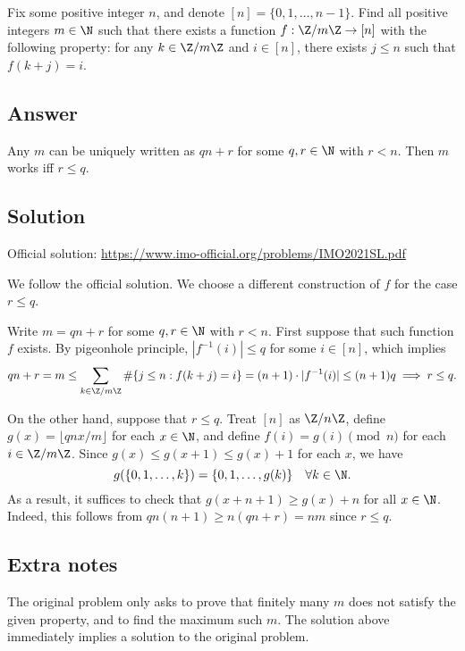 Fix some positive integer $n$, and denote $[n] = \{0, 1, \ldots, n - 1\}$.
Find all positive integers $m \in \N$ such that there exists a function $f : \Z/m\Z \to [n]$ with the following property:
    for any $k \in \Z/m\Z$ and $i \in [n]$, there exists $j \leq n$ such that $f(k + j) = i$.



\subsection*{Answer}

Any $m$ can be uniquely written as $qn + r$ for some $q, r \in \N$ with $r < n$.
Then $m$ works iff $r \leq q$.



\subsection*{Solution}

Official solution: \url{https://www.imo-official.org/problems/IMO2021SL.pdf}

We follow the official solution.
We choose a different construction of $f$ for the case $r \leq q$.

Write $m = qn + r$ for some $q, r \in \N$ with $r < n$.
First suppose that such function $f$ exists.
By pigeonhole principle, $|f^{-1}(i)| \leq q$ for some $i \in [n]$, which implies
\[ qn + r = m \leq \sum_{k \in \Z/m\Z} \#\{j \leq n : f(k + j) = i\} = (n + 1) \cdot |f^{-1}(i)| \leq (n + 1) q \implies r \leq q. \]

On the other hand, suppose that $r \leq q$.
Treat $[n]$ as $\Z/n\Z$, define $g(x) = \lfloor qnx/m \rfloor$ for each $x \in \N$, and define $f(i) = g(i) \pmod{n}$ for each $i \in \Z/m\Z$.
Since $g(x) \leq g(x + 1) \leq g(x) + 1$ for each $x$, we have
\[ g(\{0, 1, \ldots, k\}) = \{0, 1, \ldots, g(k)\} \quad \forall k \in \N. \]
As a result, it suffices to check that $g(x + n + 1) \geq g(x) + n$ for all $x \in \N$.
Indeed, this follows from $qn(n + 1) \geq n(qn + r) = nm$ since $r \leq q$.



\subsection*{Extra notes}

The original problem only asks to prove that finitely many $m$ does not satisfy the given property, and to find the maximum such $m$.
The solution above immediately implies a solution to the original problem.
